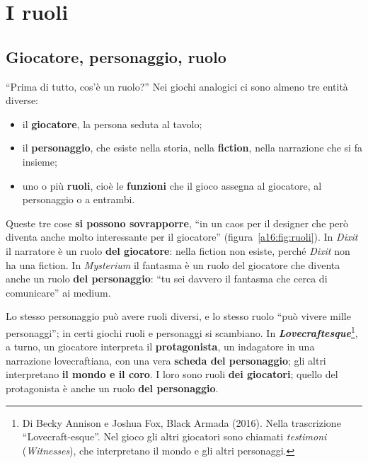 \section{I ruoli}
\label{a16:sec:ruoli}

\subsection{Giocatore, personaggio, ruolo}



``Prima di tutto, cos'è un ruolo?'' Nei giochi analogici ci sono almeno tre entità diverse:
\begin{itemize}
  \item il \textbf{giocatore}, la persona seduta al tavolo;
  \item il \textbf{personaggio}, che esiste nella storia, nella \textbf{fiction}, nella
        narrazione che si fa insieme;
  \item uno o più \textbf{ruoli}, cioè le \textbf{funzioni} che il gioco assegna al giocatore,
        al personaggio o a entrambi.
\end{itemize}
Queste tre cose \textbf{si possono sovrapporre}, ``in un caos per il designer che però diventa
anche molto interessante per il giocatore'' (figura~\ref{a16:fig:ruoli}). In \emph{Dixit} il
narratore è un ruolo \textbf{del giocatore}: nella fiction non esiste, perché \emph{Dixit} non
ha una fiction. In \emph{Mysterium} il fantasma è un ruolo del giocatore che diventa anche un
ruolo \textbf{del personaggio}: ``tu sei davvero il fantasma che cerca di comunicare'' ai medium.

Lo stesso personaggio può avere ruoli diversi, e lo stesso ruolo ``può vivere mille
personaggi''; in certi giochi ruoli e personaggi si scambiano. In
\textbf{\emph{Lovecraftesque}}\footnote{Di Becky Annison e Joshua Fox, Black Armada (2016). Nella
trascrizione ``Lovecraft-esque''. Nel gioco gli altri giocatori sono chiamati
\emph{testimoni} (\emph{Witnesses}), che interpretano il mondo e gli altri personaggi.}, a turno,
un giocatore interpreta il \textbf{protagonista}, un indagatore in una narrazione lovecraftiana,
con una vera \textbf{scheda del personaggio}; gli altri interpretano \textbf{il mondo e il coro}.
I loro sono ruoli \textbf{dei giocatori}; quello del protagonista è anche un ruolo \textbf{del
personaggio}.

